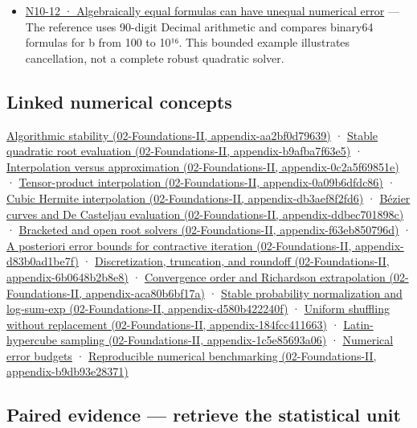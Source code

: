 \begin{itemize}
\item
  \href{Continuous\%20Notes/Computing\%20Foundations\%20-\%20From\%20Bits\%20to\%20C++\%20and\%20Systems\%20APIs\#Figure\%20N10-12\%20—\%20Algebraically\%20equal\%20formulas\%20can\%20have\%20unequal\%20numerical\%20error}{N10-12 · Algebraically equal formulas can have unequal numerical error} --- The reference uses 90-digit Decimal arithmetic and compares binary64 formulas for b from 100 to 10¹⁶. This bounded example illustrates cancellation, not a complete robust quadratic solver.
\end{itemize}

\subsection{Linked numerical concepts}\label{linked-numerical-concepts}

\href{}{Algorithmic stability (02-Foundations-II, appendix-aa2bf0d79639)} · \href{}{Stable quadratic root evaluation (02-Foundations-II, appendix-b9afba7f63e5)} · \href{}{Interpolation versus approximation (02-Foundations-II, appendix-0c2a5f69851e)} · \href{}{Tensor-product interpolation (02-Foundations-II, appendix-0a09b6dfdc86)} · \href{}{Cubic Hermite interpolation (02-Foundations-II, appendix-db3aef8f2fd6)} · \href{}{Bézier curves and De Casteljau evaluation (02-Foundations-II, appendix-ddbec701898c)} · \href{}{Bracketed and open root solvers (02-Foundations-II, appendix-f63eb850796d)} · \href{}{A posteriori error bounds for contractive iteration (02-Foundations-II, appendix-d83b0ad1be7f)} · \href{}{Discretization, truncation, and roundoff (02-Foundations-II, appendix-6b0648b2b8e8)} · \href{}{Convergence order and Richardson extrapolation (02-Foundations-II, appendix-aca80b6bf17a)} · \href{}{Stable probability normalization and log-sum-exp (02-Foundations-II, appendix-d580b422240f)} · \href{}{Uniform shuffling without replacement (02-Foundations-II, appendix-184fcc411663)} · \href{}{Latin-hypercube sampling (02-Foundations-II, appendix-1c5e85693a06)} · \hyperref[appendix-31b8c295e05f]{Numerical error budgets} · \href{}{Reproducible numerical benchmarking (02-Foundations-II, appendix-b9db93e28371)}

\subsection{Paired evidence --- retrieve the statistical unit}\label{paired-evidence-retrieve-the-statistical-unit}

